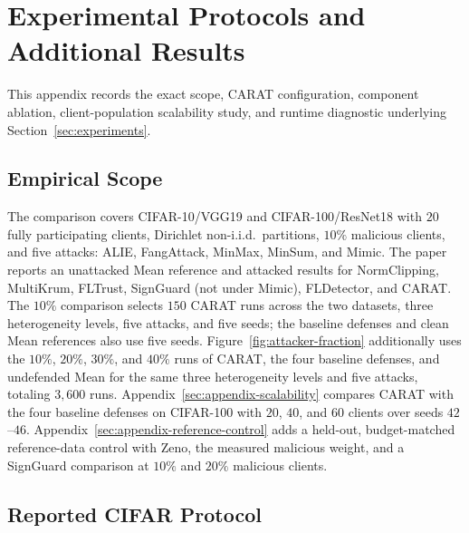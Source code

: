 \section{Experimental Protocols and Additional Results}
\label{sec:appendix-experiments}

This appendix records the exact scope, CARAT configuration, component ablation, client-population scalability study, and runtime diagnostic underlying Section~\ref{sec:experiments}.

\subsection{Empirical Scope}

The comparison covers CIFAR-10/VGG19 and CIFAR-100/ResNet18 with $20$ fully participating clients, Dirichlet non-i.i.d.\ partitions, $10\%$ malicious clients, and five attacks: ALIE, FangAttack, MinMax, MinSum, and Mimic. The paper reports an unattacked Mean reference and attacked results for NormClipping, MultiKrum, FLTrust, SignGuard (not under Mimic), FLDetector, and CARAT. The $10\%$ comparison selects $150$ CARAT runs across the two datasets, three heterogeneity levels, five attacks, and five seeds; the baseline defenses and clean Mean references also use five seeds. Figure~\ref{fig:attacker-fraction} additionally uses the $10\%$, $20\%$, $30\%$, and $40\%$ runs of CARAT, the four baseline defenses, and undefended Mean for the same three heterogeneity levels and five attacks, totaling $3{,}600$ runs. Appendix~\ref{sec:appendix-scalability} compares CARAT with the four baseline defenses on CIFAR-100 with $20$, $40$, and $60$ clients over seeds $42$--$46$. Appendix~\ref{sec:appendix-reference-control} adds a held-out, budget-matched reference-data control with Zeno, the measured malicious weight, and a SignGuard comparison at $10\%$ and $20\%$ malicious clients.

\subsection{Reported CIFAR Protocol}

